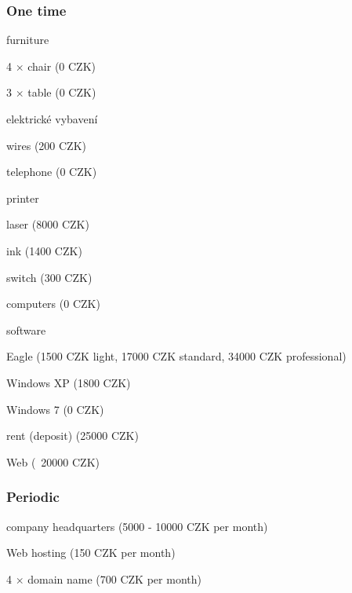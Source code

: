 \documentclass[a4paper,twoside,15pt]{book}
\begin{document}
				\subsubsection{One time}
					\begin{dinglist}{73}
						\item furniture
							\begin{dinglist}{75}
								\item 4 $\times$ chair (0 CZK)
								\item 3 $\times$ table (0 CZK)
							\end{dinglist}
						\item elektrické vybavení
							\begin{dinglist}{75}
								\item wires (200 CZK)
								\item telephone (0 CZK)
								\item printer
									\begin{dinglist}{77}
										\item laser (8000 CZK)
										\item ink (1400 CZK)
									\end{dinglist}
								\item switch (300 CZK)
								\item computers (0 CZK)
							\end{dinglist}
						\item software
							\begin{dinglist}{75}
								\item Eagle (1500 CZK light, 17000 CZK standard, 34000 CZK professional)
								\item Windows XP (1800 CZK)
								\item Windows 7 (0 CZK)
							\end{dinglist}
						\item rent (deposit) (25000 CZK)
						\item Web (~20000 CZK)
					\end{dinglist}
				\subsubsection{Periodic}
					\begin{dinglist}{73}
						\item company headquarters (5000 - 10000 CZK per month)
						\item Web hosting (150 CZK per month)
						\item 4 $\times$ domain name (700 CZK per month)
					\end{dinglist}
\end{document}
